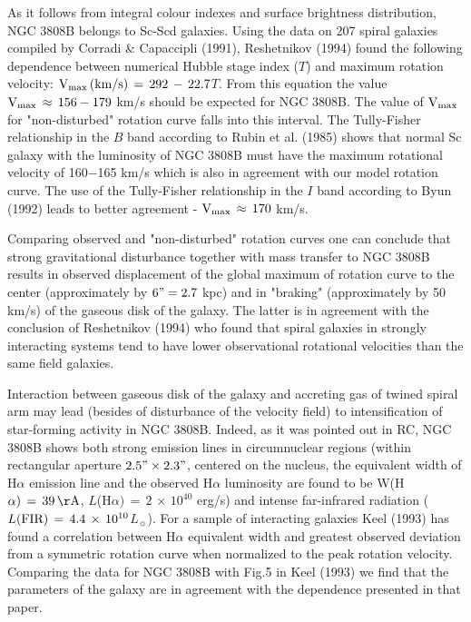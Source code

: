 As it follows from integral colour indexes and surface brightness
distribution, NGC 3808B belongs to Sc-Scd galaxies. Using the
data on 207 spiral galaxies compiled by Corradi \& Capaccipli (1991),
Reshetnikov (1994) found the following dependence between numerical
Hubble stage index ($T$) and maximum rotation velocity:
$\rm V_{max}\,(km/s)\,=\,292\,-\,22.7$$T$. From this equation the
value $\rm V_{max}\,\approx\,156-179$ km/s should be expected for
NGC 3808B. The value of $\rm V_{max}$ for "non-disturbed" rotation
curve falls into this interval. The Tully-Fisher relationship in the
$B$ band according to Rubin et al. (1985) shows that normal Sc galaxy
with the luminosity of NGC 3808B must have the maximum rotational
velocity of 160$-$165 km/s which is also in agreement with our model 
rotation curve. The use of the Tully-Fisher relationship in the $I$
band according to Byun (1992) leads to better agreement - 
$\rm V_{max}\,\approx\,170$ km/s.

Comparing observed and "non-disturbed" rotation curves one can conclude
that strong gravitational disturbance together with mass transfer
to NGC 3808B results in observed displacement of the global maximum
of rotation curve to the center (approximately by $\rm 6"=2.7$ kpc) and
in "braking" (approximately by 50 km/s) of the gaseous disk of the
galaxy. The latter is in agreement with the conclusion of Reshetnikov (1994)
who found that spiral galaxies in strongly interacting systems tend to
have lower observational rotational velocities than the same field galaxies.
 
Interaction between gaseous disk of the galaxy and accreting gas of
twined spiral arm may lead (besides of disturbance of the velocity
field) to intensification of star-forming activity in NGC 3808B.
Indeed, as it was pointed out in RC, NGC 3808B shows both strong
emission lines in circumnuclear regions (within rectangular aperture
$\rm 2.5"\times2.3"$, centered on the nucleus, the equivalent width
of H$\alpha$ emission line and the observed H$\alpha$ luminosity
are found to be W(H$\alpha)\,=\,39\,\rm\AA$,
$L$(H$\alpha)\,=\,2\,\times\,10^{40}$ erg/s)
and intense far-infrared radiation ($L\rm (FIR)\,=\,4.4\,\times\,
10^{10}$$L_{\sun}$). For a sample of interacting galaxies Keel (1993)
has found a correlation between H$\alpha$ equivalent width and greatest
observed deviation from a symmetric rotation curve when normalized to
the peak rotation velocity. Comparing the data for NGC 3808B with Fig.5
in Keel (1993) we find that the parameters of the galaxy are in agreement
with the dependence presented in that paper.


